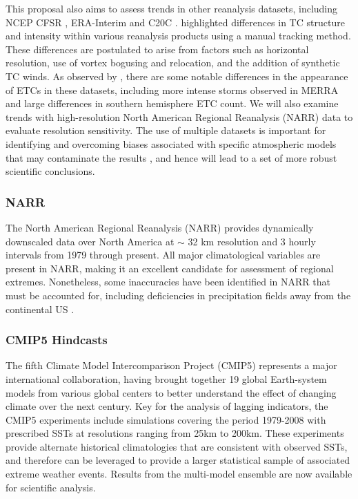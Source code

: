 \documentclass[11pt]{article}
\newcommand\citep{\cite}
\newcommand\citet{\cite}
\begin{document}
This proposal also aims to assess trends in other reanalysis datasets, including NCEP CFSR \citep{saha2010ncep}, ERA-Interim \citep{simmons2007era} and C20C \citep{compo2011twentieth}. \citet{Schenkel2012} highlighted differences in TC structure and intensity within various reanalysis products using a manual tracking method. These differences are postulated to arise from factors such as horizontal resolution, use of vortex bogusing and relocation, and the addition of synthetic TC winds. As observed by \cite{hodges2011comparison}, there are some notable differences in the appearance of ETCs in these datasets, including more intense storms observed in MERRA and large differences in southern hemisphere ETC count.  We will also examine trends with high-resolution North American Regional Reanalysis (NARR) data to evaluate resolution sensitivity.  The use of multiple datasets is important for identifying and overcoming biases associated with specific atmospheric models that may contaminate the results \citep{jun2008spatial}, and hence will lead to a set of more robust scientific conclusions.

\subsubsection*{NARR} \label{sec:NARR}

The North American Regional Reanalysis (NARR) \citep{mesinger2006north} provides dynamically downscaled data over North America at $\sim$ 32 km resolution and 3 hourly intervals from 1979 through present.  All major climatological variables are present in NARR, making it an excellent candidate for assessment of regional extremes.  Nonetheless, some inaccuracies have been identified in NARR that must be accounted for, including deficiencies {\color{blue}in} precipitation fields away from the continental US \citep{bukovsky2007brief}.

\subsubsection*{CMIP5 Hindcasts} \label{sec:CMIP5}

The fifth Climate Model Intercomparison Project (CMIP5) represents a major international collaboration, having brought together 19 global Earth-system models from {\color{blue}various global centers} to better understand the effect of changing climate over the next century.  Key for the analysis of lagging indicators, the CMIP5 experiments include simulations covering the period 1979-2008 with prescribed SSTs at resolutions ranging from 25km to 200km.  These experiments provide alternate historical climatologies that are consistent with observed SSTs, and {\color{blue}therefore} can be leveraged to provide a larger statistical sample of associated extreme weather events.  Results from the multi-model ensemble are now available for scientific analysis.
\end{document}
